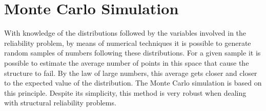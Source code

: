 \section{Monte Carlo Simulation}
With knowledge of the distributions followed by the variables involved in the
reliability problem, by means of numerical techniques it is possible to generate
random samples of numbers following these distributions. For a given sample it is
possible to estimate the average number of points in this space that cause the structure
to fail. By the law of large numbers, this average gets closer and closer to the expected
value of the distribution. The Monte Carlo simulation is based on this principle. Despite
its simplicity, this method is very robust when dealing with structural reliability problems.
